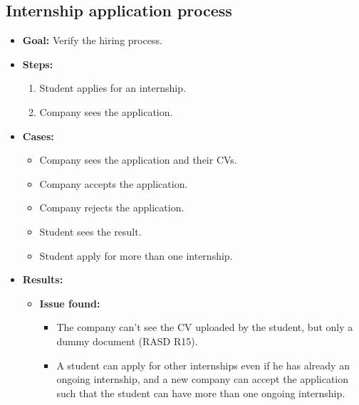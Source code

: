 \subsection{Internship application process}
\begin{itemize}
    \item \textbf{Goal:} Verify the hiring process.

    \item \textbf{Steps:}
    \begin{enumerate}
        \item Student applies for an internship.
        \item Company sees the application.
    \end{enumerate}
    \item \textbf{Cases:}
    \begin{itemize}
        \item Company sees the application and their CVs.
        \item Company accepts the application.
        \item Company rejects the application.
        \item Student sees the result.
        \item Student apply for more than one internship.
    \end{itemize}
    \item \textbf{Results:}
    \begin{itemize}
        \item \textbf{Issue found:}
        \begin{itemize}
            \item The company can't see the CV uploaded by the student, but only a dummy document (RASD R15).
            \item A student can apply for other internships even if he has already an ongoing internship, and a new company can
                accept the application such that the student can have more than one ongoing internship.
        \end{itemize}
    \end{itemize}
\end{itemize}

